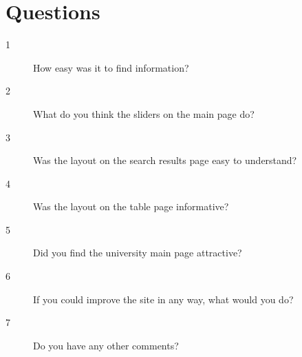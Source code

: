 \documentclass[11pt]{article} %
\begin{document}
\section{Questions}\label{sec:quest}
\begin{description}
    \item[1] How easy was it to find information? \newline\newline
    \item[2] What do you think the sliders on the main page do? \newline\newline\newline
    \item[3] Was the layout on the search results page easy to understand? \newline\newline\newline
    \item[4] Was the layout on the table page informative? \newline\newline\newline
    \item[5] Did you find the university main page attractive? \newline\newline\newline
    \item[6] If you could improve the site in any way, what would you do? \newline\newline\newline
    \item[7] Do you have any other comments?

\end{description}
\end{document}
